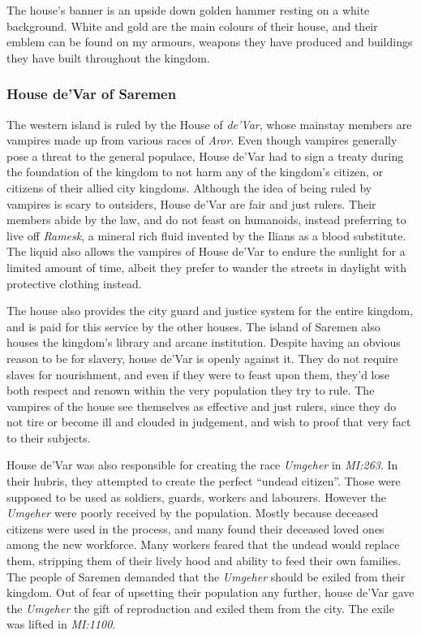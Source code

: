 The house's banner is an upside down golden hammer resting on a white
background. White and gold are the main colours of their house, and their
emblem can be found on my armours, weapons they have produced and buildings
they have built throughout the kingdom.

\subsubsection{House de'Var of Saremen}
\label{sec:House deVar}

The western island is ruled by the House of \emph{de'Var}, whose mainstay
members are vampires made up from various races of \emph{Aror}. Even though
vampires generally pose a threat to the general populace, House de'Var
had to sign a treaty during the foundation of the kingdom to not harm any of
the kingdom's citizen, or citizens of their allied city kingdoms. Although
the idea of being ruled by vampires is scary to outsiders, House de'Var
are fair and just rulers. Their members abide by the law, and do not feast on
humanoids, instead preferring to live off \emph{Ramesk}, a mineral rich fluid
invented by the Ilians as a blood substitute. The liquid also allows the
vampires of House de'Var to endure the sunlight for a limited amount of
time, albeit they prefer to wander the streets in daylight with protective
clothing instead.

The house also provides the city guard and justice system for the entire
kingdom, and is paid for this service by the other houses. The island of
Saremen also houses the kingdom's library and arcane institution. Despite
having an obvious reason to be for slavery, house de'Var is openly against
it. They do not require slaves for nourishment, and even if they were to feast
upon them, they'd lose both respect and renown within the very population they
try to rule. The vampires of the house see themselves as effective and just
rulers, since they do not tire or become ill and clouded in judgement, and
wish to proof that very fact to their subjects.

House de'Var was also responsible for creating the race \emph{Umgeher} in
\emph{MI:263}. In their hubris, they attempted to create the perfect ``undead
citizen''. Those were supposed to be used as soldiers, guards, workers and
labourers. However the \emph{Umgeher} were poorly received by the
population. Mostly because deceased citizens were used in the process, and
many found their deceased loved ones among the new workforce. Many workers
feared that the undead would replace them, stripping them of their lively hood
and ability to feed their own families. The people of Saremen demanded that
the \emph{Umgeher} should be exiled from their kingdom. Out of fear of
upsetting their population any further, house de'Var gave the \emph{Umgeher}
the gift of reproduction and exiled them from the city. The exile was lifted
in \emph{MI:1100}.

